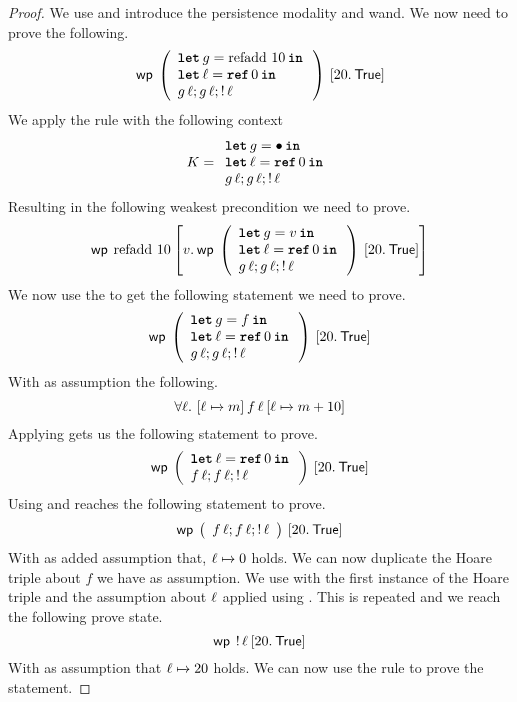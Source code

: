 \documentclass[thesis.tex]{subfiles}
\begin{document}
\begin{proof}
  We use  and introduce the persistence modality and wand. We now need to prove the following.
  \[\wpre{
      \left(
      \begin{array}{l}
        \Let g = \operatorname{refadd}\, 10 in \\
        \Let \loc = \Alloc 0 in                \\
        g\, \loc; g\, \loc; \deref \loc
      \end{array}
      \right)
    }{\Ret 20. \TRUE}\]
  We apply the  rule with the following context
  \[
    \lctx = \begin{array}{l}
      \Let g = \bullet in     \\
      \Let \loc = \Alloc 0 in \\
      g\, \loc; g\, \loc; \deref \loc
    \end{array}
  \]
  Resulting in the following weakest precondition we need to prove.
  \[
    \wpre{\operatorname{refadd}\, 10}{
      \Ret\val. \wpre{\left(\begin{array}{l}
          \Let g = \val in        \\
          \Let \loc = \Alloc 0 in \\
          g\, \loc; g\, \loc; \deref \loc
        \end{array}\right)}{\Ret 20. \TRUE}
    }
  \]
  We now use the  to get the following statement we need to prove.
  \[
    \wpre{\left(\begin{array}{l}
        \Let g = f in           \\
        \Let \loc = \Alloc 0 in \\
        g\, \loc; g\, \loc; \deref \loc
      \end{array}\right)}{\Ret 20. \TRUE}
  \]
  With as assumption the following.
  \[
    \forall \loc.\ \hoare{\loc \fmapsto m}{f\, \loc}{\loc\fmapsto m + 10}
  \]
  Applying  gets us the following statement to prove.
  \[
    \wpre{\left(\begin{array}{l}
        \Let \loc = \Alloc 0 in \\
        f\, \loc; f\, \loc; \deref \loc
      \end{array}\right)}{\Ret 20. \TRUE}
  \]
  Using  and  reaches the following statement to prove.
  \[
    \wpre{\left(\begin{array}{l}
        f\, \loc; f\, \loc; \deref \loc
      \end{array}\right)}{\Ret 20. \TRUE}
  \]
  With as added assumption that, $\loc \fmapsto 0$ holds. We can now duplicate the Hoare triple about $f$ we have as assumption. We use  with the first instance of the Hoare triple and the assumption about $\ell$ applied using . This is repeated and we reach the following prove state.
  \[
    \wpre{\deref \loc}{\Ret 20. \TRUE}
  \]
  With as assumption that $\loc \fmapsto 20$ holds. We can now use the  rule to prove the statement.

\end{proof}
\end{document}
